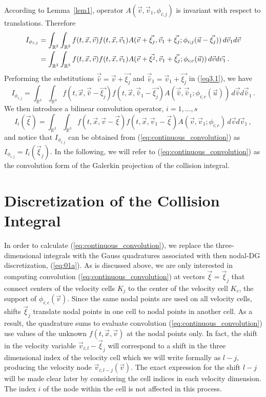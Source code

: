 \documentclass[12pt]{CSUNthesis}
\def\R{\mathbb{R}}
\def\R{\mathbb{R}}
\begin{document}
According to  Lemma~{\ref{lem1}}, operator $A(\vec{v},\vec{v}_1,\phi_{i;j})$ is invariant with respect to translations. Therefore
\begin{align}
\label{eq3.1}
I_{\phi_{i;j}} &= \int_{\R^3}\int_{\R^3} f(t,\vec{x},\vec{v})f(t,\vec{x},\vec{v}_{1})A(\vec{v}+\vec{\xi_{j}},\vec{v}_1+\vec{\xi_{j}}; \phi_{i;j}(\vec{u} - \vec{\xi_{j}})) \, d\vec{v}_{1} d\vec{v} \notag\\
 &= \int_{\R^3}\int_{\R^3} f(t,\vec{x},\vec{v})f(t,\vec{x},\vec{v}_{1})A(\vec{v}+\vec{\xi^{j}},\vec{v}_{1}+\vec{\xi_{j}}; \phi_{i;c}(\vec{u})) \, d\vec{v} d\vec{v_{1}} \, .
\end{align}
Performing the substitutions $\vec{\hat{v}} = \vec{v}+\vec{\xi_{j}} $ and $ \vec{\hat{v}}_1 = \vec{v}_{1}+\vec{\xi_{j}}$ in (\ref{eq3.1}), we have
\begin{equation*}
I_{\phi_{i;j}} = \int_{\R^3}\int_{\R^3} f(t,\vec{x},\vec{\hat{v}}-\vec{\xi_{j}}) f(t,\vec{x},\vec{\hat{v}}_1-\vec{\xi_{j}}) A(\vec{\hat{v}},\vec{\hat{v}}_{1};\phi_{i;c}(\vec{u})) \, d\vec{\hat{v}} d\vec{\hat{v}}_1 \, .
\end{equation*}
We then introduce a bilinear convolution operator, $i=1,\ldots,s$
\begin{equation}
\label{eq:continuous_convolution}
I_i(\vec{\xi}) = \int_{\R^3}\int_{\R^3} f(t,\vec{x},\vec{v}-\vec{\xi})f(t,\vec{x},\vec{v}_{1}-\vec{\xi})A(\vec{v},\vec{v}_{1}; \phi_{i;c}) \, d\vec{v} d\vec{v}_{1} \, ,
\end{equation}
and notice that $I_{\phi_{i;j}}$ can be obtained from (\ref{eq:continuous_convolution}) as
$I_{\phi_{i;j}}=I_i(\vec{\xi}_j)$. In the following, we will refer to (\ref{eq:continuous_convolution}) 
as the convolution form of the Galerkin projection of the collision integral.

\section{Discretization of the Collision Integral}
In order to calculate (\ref{eq:continuous_convolution}), we replace the three-dimensional integrals with the Gauss quadratures associated with then nodal-DG discretization, (\ref{eq:01a}). 
As is discussed above, we are only interested in 
computing convolution (\ref{eq:continuous_convolution}) at vectors 
$\vec{\xi}=\vec{\xi}_{j}$ that connect centers of the velocity cells $K_j$ to the 
center of the velocity cell $K_c$, the support of $\phi_{i;c}(\vec{v})$. Since the 
same nodal points are used on all velocity cells, shifts $\vec{\xi}_{j}$ 
translate nodal points in one cell to nodal points 
in another cell. As a result, the quadrature sums to evaluate convolution (\ref{eq:continuous_convolution})
use values of the unknown $f(t,\vec{x},\vec{v})$ at the nodal points
only. In fact, the shift in the velocity variable 
$\vec{v}_{i;l}-\vec{\xi}_{j}$ will correspond 
to a shift in the three dimensional index of the velocity cell 
which we will write formally as $l-j$, 
producing the velocity node $\vec{v}_{i;l-j}(\vec{v})$. The exact expression 
for the shift $l-j$ will be made clear later by considering the cell indices in 
each velocity dimension. The index $i$ of the node within the cell is not 
affected in this process. 
\end{document}
